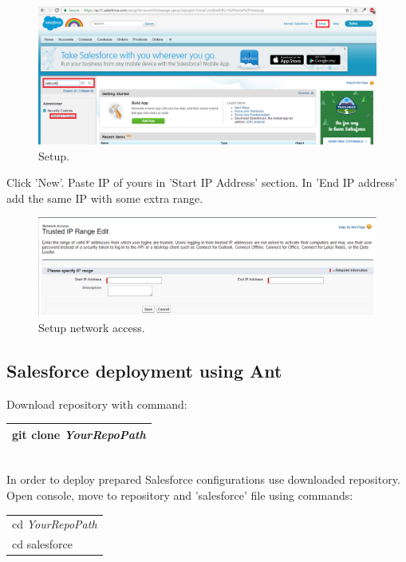 \documentclass[12pt,a4paper]{article}
\begin{document}
\begin{figure}[H]
	\centering
	\includegraphics[width = 1 \textwidth]{images/network.PNG}
	\caption{Setup.}
	\label{fig:setup}
\end{figure}

Click 'New'. Paste IP of yours in 'Start IP Address' section. In 'End IP address' add the same IP with some extra range.

\begin{figure}[H]
	\centering
	\includegraphics[width = 1 \textwidth]{images/network2.PNG}
	\caption{Setup network access.}
	\label{fig:setupp}
\end{figure}

\subsection{Salesforce deployment using Ant}
Download repository with command:\\
\begin{tabular}{|l|}
	\hline
	git clone \textit{YourRepoPath}\\
	\hline
\end{tabular}\\

In order to deploy prepared Salesforce configurations use downloaded repository. Open console, move to repository and 'salesforce' file using commands:\\

\begin{tabular}{|l|}
	\hline
	cd \textit{YourRepoPath}\\
	cd salesforce\\
	\hline
\end{tabular}\\
\end{document}
